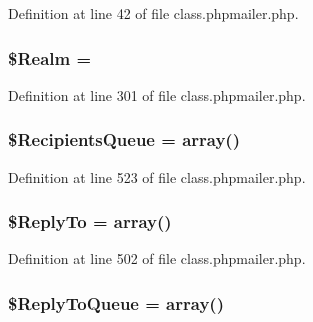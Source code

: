 Definition at line 42 of file class.\+phpmailer.\+php.

\subsubsection[{\texorpdfstring{\$\+Realm}{$Realm}}]{\setlength{\rightskip}{0pt plus 5cm}\$Realm = \textquotesingle{}\textquotesingle{}}\hypertarget{class_p_h_p_mailer_a992213fc362ebe731af595e6f4c7e49b}{}\label{class_p_h_p_mailer_a992213fc362ebe731af595e6f4c7e49b}


Definition at line 301 of file class.\+phpmailer.\+php.

\subsubsection[{\texorpdfstring{\$\+Recipients\+Queue}{$RecipientsQueue}}]{\setlength{\rightskip}{0pt plus 5cm}\$Recipients\+Queue = array()\hspace{0.3cm}{\ttfamily [protected]}}\hypertarget{class_p_h_p_mailer_a51a46f673baf030a5777085861cc2e27}{}\label{class_p_h_p_mailer_a51a46f673baf030a5777085861cc2e27}


Definition at line 523 of file class.\+phpmailer.\+php.

\subsubsection[{\texorpdfstring{\$\+Reply\+To}{$ReplyTo}}]{\setlength{\rightskip}{0pt plus 5cm}\$Reply\+To = array()\hspace{0.3cm}{\ttfamily [protected]}}\hypertarget{class_p_h_p_mailer_a856ec7458d9fa38bb18e41d255d427ca}{}\label{class_p_h_p_mailer_a856ec7458d9fa38bb18e41d255d427ca}


Definition at line 502 of file class.\+phpmailer.\+php.

\subsubsection[{\texorpdfstring{\$\+Reply\+To\+Queue}{$ReplyToQueue}}]{\setlength{\rightskip}{0pt plus 5cm}\$Reply\+To\+Queue = array()\hspace{0.3cm}{\ttfamily [protected]}}\hypertarget{class_p_h_p_mailer_a2518fc6416330a3dad2d83beff2e3a8d}{}\label{class_p_h_p_mailer_a2518fc6416330a3dad2d83beff2e3a8d}


